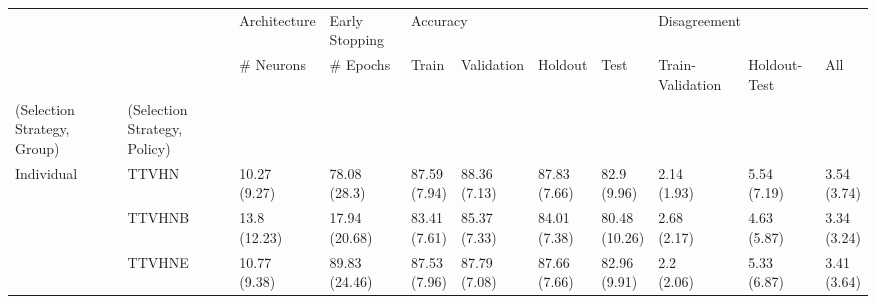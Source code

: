 \begin{table}
\centering
\label{tab:no_premature_early_stopping}
\begin{tabular}{lllllllllll}
\toprule
       &         &   Architecture & Early Stopping & \multicolumn{4}{l}{Accuracy} & \multicolumn{3}{l}{Disagreement} \\
       &         &      \# Neurons &       \# Epochs &          Train &    Validation &       Holdout &           Test & Train-Validation & Holdout-Test &          All \\
(Selection Strategy, Group) & (Selection Strategy, Policy) &                &                &                &               &               &                &                  &              &              \\
\midrule
Individual & TTVHN &   \makecell{10.27\\(9.27)} &   \makecell{78.08\\(28.3)} &   \makecell{87.59\\(7.94)} &  \makecell{88.36\\(7.13)} &  \makecell{87.83\\(7.66)} &    \makecell{82.9\\(9.96)} &      \makecell{2.14\\(1.93)} &  \makecell{5.54\\(7.19)} &  \makecell{3.54\\(3.74)} \\
       & TTVHNB &   \makecell{13.8\\(12.23)} &  \makecell{17.94\\(20.68)} &   \makecell{83.41\\(7.61)} &  \makecell{85.37\\(7.33)} &  \makecell{84.01\\(7.38)} &  \makecell{80.48\\(10.26)} &      \makecell{2.68\\(2.17)} &  \makecell{4.63\\(5.87)} &  \makecell{3.34\\(3.24)} \\
       & TTVHNE &   \makecell{10.77\\(9.38)} &  \makecell{89.83\\(24.46)} &   \makecell{87.53\\(7.96)} &  \makecell{87.79\\(7.08)} &  \makecell{87.66\\(7.66)} &   \makecell{82.96\\(9.91)} &       \makecell{2.2\\(2.06)} &  \makecell{5.33\\(6.87)} &  \makecell{3.41\\(3.64)} \\

\end{tabular}
\end{table}
